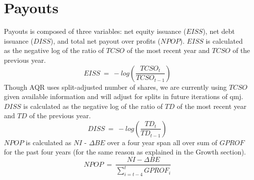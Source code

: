 \documentclass[12pt]{article}
\begin{document}
\section*{Payouts}
Payouts is composed of three variables: net equity issuance ($EISS$), net debt issuance ($DISS$), and total net payout over profits ($NPOP$). $EISS$ is calculated as the negative log of the ratio of $TCSO$ of the most recent year and $TCSO$ of the previous year. $$EISS \ = \ -log\left(\frac{TCSO_t}{TCSO_{t-1}}\right)$$ Though AQR uses split-adjusted number of shares, we are currently using $TCSO$ given available information and will adjust for splits in future iterations of qmj. $DISS$ is calculated as the negative log of the ratio of $TD$ of the most recent year and $TD$ of the previous year. $$DISS \ = \ -log\left(\frac{TD_t}{TD_{t-1}}\right)$$ $NPOP$ is calculated as $NI$ - $\Delta BE$ over a four year span all over sum of $GPROF$ for the past four years (for the same reason as explained in the Growth section). $$NPOP \ = \ \frac{NI - \Delta BE}{\sum_{i=t-4}^{t}GPROF_i}$$
\end{document}
